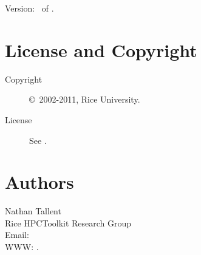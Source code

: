 \documentclass[english]{article}
\begin{document}
Version: \Version\ of \Date.

\section{License and Copyright}

\begin{description}
\item[Copyright] \copyright\ 2002-2011, Rice University.
\item[License] See .
\end{description}

\section{Authors}

\noindent
Nathan Tallent \\
Rice HPCToolkit Research Group \\
Email:  \\
WWW: .

\LatexManEnd
\end{document}
